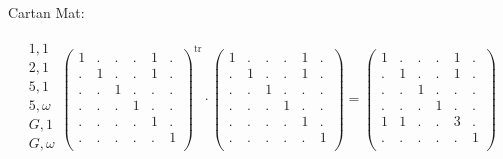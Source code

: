 \documentclass[12pt,a4paper]{amsart}
\begin{document}

\newpage
\normalsize {}
Cartan Mat:

\begin{align*}
  \begin{array}{r}
    1,1 \\ \hline
    2,1 \\ \hline
    5,1 \\
    5,\omega \\ \hline
    G,1 \\
    G,\omega \\
  \end{array}
  \left(
  \begin{array}{c|c|cc|cc}
    1&.&.&.&1&.\\\hline
    .&1&.&.&1&.\\\hline
    .&.&1&.&.&.\\
    .&.&.&1&.&.\\\hline
    .&.&.&.&1&.\\
    .&.&.&.&.&1\\
  \end{array}
\right)^{\mathrm{tr}}
\cdot
  \left(
  \begin{array}{c|c|cc|cc}
    1&.&.&.&1&.\\\hline
    .&1&.&.&1&.\\\hline
    .&.&1&.&.&.\\
    .&.&.&1&.&.\\\hline
    .&.&.&.&1&.\\
    .&.&.&.&.&1\\
  \end{array}
\right)
=
  \left(
  \begin{array}{c|c|cc|cc}
    1&.&.&.&1&.\\\hline
    .&1&.&.&1&.\\\hline
    .&.&1&.&.&.\\
    .&.&.&1&.&.\\\hline
    1&1&.&.&3&.\\
    .&.&.&.&.&1\\
  \end{array}
\right)
\end{align*}
\end{document}
